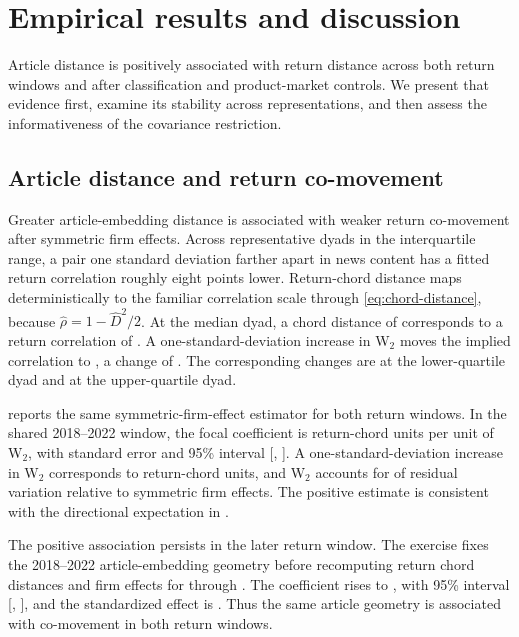 \section{Empirical results and discussion}\label{sec:results}

Article distance is positively associated with return distance across both
return windows and after classification and product-market controls.
We present that evidence first, examine its stability across representations,
and then assess the informativeness of the covariance restriction.

\subsection{Article distance and return co-movement}
\label{sec:post-window-dyadic}

Greater article-embedding distance is associated with weaker return
co-movement after symmetric firm effects.
Across representative dyads in the interquartile range, a pair one standard
deviation farther apart in news content has a fitted return correlation
roughly eight points lower.
Return-chord distance maps deterministically to the familiar correlation
scale through \eqref{eq:chord-distance}, because $\hat\rho=1-\hat D^2/2$.
At the median dyad, a chord distance of  corresponds
to a return correlation of .
A one-standard-deviation increase in W$_2$ moves the implied correlation to
, a change of
.
The corresponding changes are  at the
lower-quartile dyad and  at the
upper-quartile dyad.

 reports the same symmetric-firm-effect
estimator for both return windows.
In the shared 2018--2022 window, the focal coefficient is
 return-chord units per unit of W$_2$, with
standard error  and 95\% interval
[, ].
A one-standard-deviation increase in W$_2$ corresponds to
 return-chord units, and W$_2$ accounts
for  of residual variation relative to
symmetric firm effects.
The positive estimate is consistent with the directional expectation in
.

The positive association persists in the later return window.
The exercise fixes the 2018--2022 article-embedding geometry before
recomputing return chord distances and firm effects for
 through
.
The coefficient rises to , with 95\% interval
[, ], and the
standardized effect is .
Thus the same article geometry is associated with co-movement in both
return windows.

